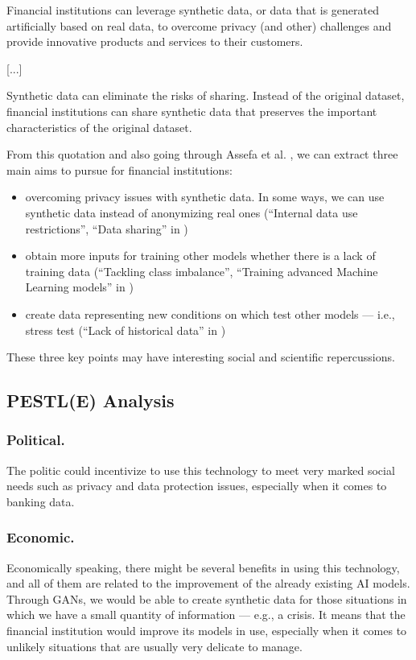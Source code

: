 \documentclass[runningheads]{llncs}
\begin{document}
\begin{displayquote}
Financial institutions can leverage synthetic data, or data that is generated artificially based on real data, to overcome privacy (and other) challenges and provide innovative products and services to their customers.

[...]

Synthetic data can eliminate the risks of sharing. Instead of the original dataset, financial institutions can share synthetic data that preserves the important characteristics of the original dataset.
\end{displayquote}

From this quotation and also going through Assefa et al. \cite{AMEX}, we can extract three main aims to pursue for financial institutions:

\begin{itemize}
  \item overcoming privacy issues with synthetic data. In some ways, we can use synthetic data instead of anonymizing real ones (“Internal data use restrictions”, “Data sharing” in \cite{AMEX})
  \item obtain more inputs for training other models whether there is a lack of training data (“Tackling class imbalance”, “Training advanced Machine Learning models” in \cite{AMEX})
  \item create data representing new conditions on which test other models — i.e., stress test (“Lack of historical data” in \cite{AMEX})
\end{itemize}

These three key points may have interesting social and scientific repercussions.

\subsection{PESTL(E) Analysis}

\subsubsection{Political.}\label{political}
The politic could incentivize to use this technology to meet very marked social needs such as privacy and data protection issues, especially when it comes to banking data.
\subsubsection{Economic.}
Economically speaking, there might be several benefits in using this technology, and all of them are related to the improvement of the already existing AI models. Through GANs, we would be able to create synthetic data for those situations in which we have a small quantity of information — e.g., a crisis. It means that the financial institution would improve its models in use, especially when it comes to unlikely situations that are usually very delicate to manage.
\end{document}
